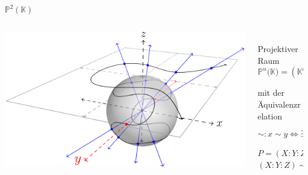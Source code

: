 \begin{frame}{$\mathbb{P}^2(\mathbb{K})$}
    \begin{columns}
        \begin{column}{0.6\textwidth}
            \includegraphics[width=\linewidth]{img/p^2.png}
        \end{column}
        \begin{column}{0.5\textwidth}
            \begin{definitionblock}{\\Projektiver Raum}
                \[
                    \mathbb{P}^n(\mathbb{K)} = \left( \mathbb{K}^{n+1} \setminus \{0\} \right) / \sim
                \]
                \begin{center}
                    mit der Äquivalenzrelation \\
                \end{center}
                \[
                    \sim: x \sim y \Leftrightarrow \exists \lambda \in \mathbb{K} \setminus \{0\} : x = \lambda y.
                \]
            \end{definitionblock}
            \vspace{1em}
            $P = (X:Y:Z) \in \mathbb{P}^2(\mathbb{K})$\\
            $(X:Y:Z)\sim(\lambda X:\lambda Y:\lambda Z)$
        \end{column}    
    \end{columns}
\end{frame}

